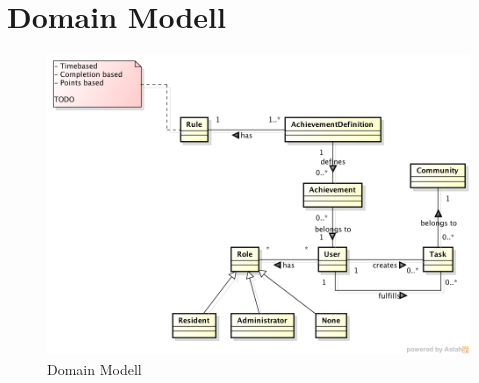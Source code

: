 \section{Domain Modell}

\begin{figure}[h]
	\centering
		\includegraphics[width=\textwidth]{content/images/domainmodel.png}
	\caption{Domain Modell}
\end{figure}
